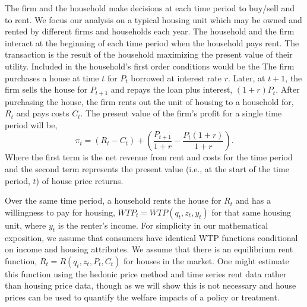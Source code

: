 \documentclass[ecta,nameyear,draft]{econsocart}
\theoremstyle{plain}
\theoremstyle{remark}
\begin{document}
The firm and the household make decisions at each time period to buy/sell and to rent. We focus our analysis on a typical housing unit which may be owned and rented by different firms and households each year. 
The household and the firm interact at the beginning of each time period when the household pays rent. The transaction is the result of the household maximizing the present value of their utility. Included in the household's first order conditions would be the  
The firm purchases a house at time $t$ for $P_t$ borrowed at interest rate $r$. Later, at $t+1$, the firm sells the house for $P_{t+1}$ and repays the loan plus interest, $(1 + r)P_t$. After purchasing the house, the firm rents
out the unit of housing to a household for, $R_t$ and pays costs $C_t$. The present value of the firm’s profit for a single time period will be,
\begin{equation}
	\pi_t = (R_t-C_t)+\left(\frac{P_{t+1}}{1+r}-\frac{P_t(1+r)}{1+r}\right).\label{pi1}
\end{equation}
Where the first term is the net revenue from rent and costs for the time period and the second term
represents the present value (i.e., at the start of the time period, $t$) of house price returns.

Over the same time period, a household rents the house for $R_t$ and has a willingness to pay for housing, $\mathit{WTP}_t=\mathit{WTP}(q_t,z_t,y_t)$ for that same housing unit, where $y_t$ is the renter's income. For simplicity in our mathematical exposition, we assume that consumers have identical WTP functions conditional on income and housing attributes. We  assume that there is an equilibrium rent function, $R_t=R(q_t,z_t,P_t,C_t)$ for houses in the market. One might estimate this function using the hedonic price method and time series rent data rather than housing price data, though as we will show this is not necessary and house prices can be used to quantify the welfare impacts of a policy or treatment. 
\end{document}
